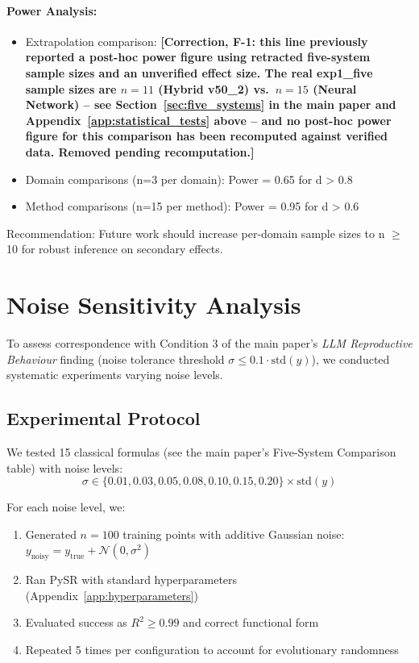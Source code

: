 \documentclass[twoside,11pt]{article}
\begin{document}
\paragraph{Power Analysis:}
\begin{itemize}
\item Extrapolation comparison: \textbf{[Correction, F-1: this line previously reported a post-hoc power figure using retracted five-system sample sizes and an unverified effect size. The real exp1\_five sample sizes are $n=11$ (Hybrid v50\_2) vs.\ $n=15$ (Neural Network) -- see Section~\ref{sec:five_systems} in the main paper and Appendix~\ref{app:statistical_tests} above -- and no post-hoc power figure for this comparison has been recomputed against verified data. Removed pending recomputation.]}
\item Domain comparisons (n=3 per domain): Power = 0.65 for d > 0.8
\item Method comparisons (n=15 per method): Power = 0.95 for d > 0.6
\end{itemize}

Recommendation: Future work should increase per-domain sample sizes to n $\geq$ 10 for robust inference on secondary effects.



\section{Noise Sensitivity Analysis}
\label{app:noise_sensitivity}

To assess correspondence with Condition 3 of the main paper's \emph{LLM Reproductive Behaviour} finding (noise tolerance threshold $\sigma \leq 0.1 \cdot \text{std}(y)$), we conducted systematic experiments varying noise levels.

\subsection{Experimental Protocol}

We tested 15 classical formulas (see the main paper's Five-System Comparison table) with noise levels:
\[
\sigma \in \{0.01, 0.03, 0.05, 0.08, 0.10, 0.15, 0.20\} \times \text{std}(y)
\]

For each noise level, we:
\begin{enumerate}
\item Generated $n = 100$ training points with additive Gaussian noise: $y_{\text{noisy}} = y_{\text{true}} + \mathcal{N}(0, \sigma^2)$
\item Ran PySR with standard hyperparameters (Appendix~\ref{app:hyperparameters})
\item Evaluated success as $R^2 \geq 0.99$ and correct functional form
\item Repeated 5 times per configuration to account for evolutionary randomness
\end{enumerate}
\end{document}
